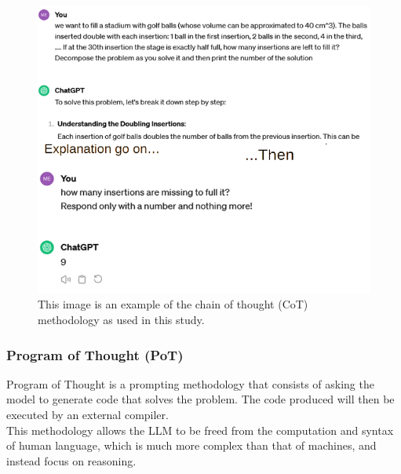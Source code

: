 \documentclass[12pt]{article}
\begin{document}
\begin{figure}[H]
    \centering
            \includegraphics[width=1\textwidth]{MyCoT.png}
    \caption[Example of Chain of Thought methodology as used]{This image is an example of the chain of thought (CoT) methodology as used in this study.}
    \end{figure} 
 
    \subsubsection{Program of Thought (PoT)}
    Program of Thought is a prompting methodology that consists of asking the model to generate code that solves the problem. The code produced will then be executed by an external compiler. \\
This methodology allows the LLM to be freed from the computation and syntax of human language, which is much more complex than that of machines, and instead focus on reasoning.  \\
  
\end{document}
